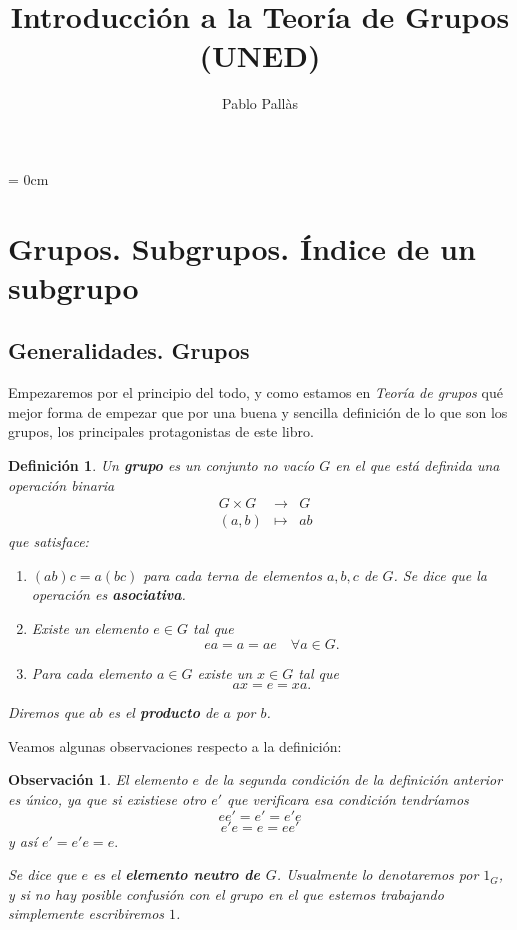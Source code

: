 \documentclass[12pt]{article}
\author{Pablo Pallàs}
\title{Introducción a la Teoría de Grupos (UNED)}
\newtheorem{definition}[theorem]{Definición}
\newtheorem{observation}{Observación}[theorem]
\begin{document}
\rmfamily
\maketitle
\vspace{2.5cm}
\tableofcontents
\parindent= 0cm
\newpage

\section{Grupos. Subgrupos. Índice de un subgrupo}
\subsection{Generalidades. Grupos}
Empezaremos por el principio del todo, y como estamos en \textit{Teoría de grupos} qué mejor forma de empezar que por una buena y sencilla definición de lo que son los grupos, los principales protagonistas de este libro.

\begin{definition}Un \textbf{grupo} es un conjunto no vacío $G$ en el que está definida una operación binaria $$\begin{array}{rccl}
&G \times G & \longrightarrow & G\\
&(a,b) & \longmapsto &ab
\end{array}
$$
que satisface: \begin{enumerate}
\item $(ab)c= a(bc)$ para cada terna de elementos $a,b,c$ de $G$. Se dice que la operación es \textbf{asociativa}.
\item Existe un elemento $e \in G$ tal que $$ea = a = ae \quad \forall a \in G.$$
\item Para cada elemento $a \in G$ existe un $x \in G$ tal que $$ax = e = xa.$$
\end{enumerate}
Diremos que $ab$ es el \textbf{producto} de $a$ por $b$.
\end{definition}

Veamos algunas observaciones respecto a la definición:

\begin{observation}El elemento $e$ de la segunda condición de la definición anterior es 
único, ya que si existiese otro $e'$ que verificara esa condición tendríamos $$ee' = e' = e'e$$ $$e'e = e = ee'$$ y así $e' = e'e = e.$

Se dice que $e$ es el \textbf{elemento neutro de $G$}. Usualmente lo denotaremos por $1_G$, y si no hay posible confusión con el grupo en el que estemos trabajando simplemente escribiremos $1$.
\end{observation}
\end{document}
